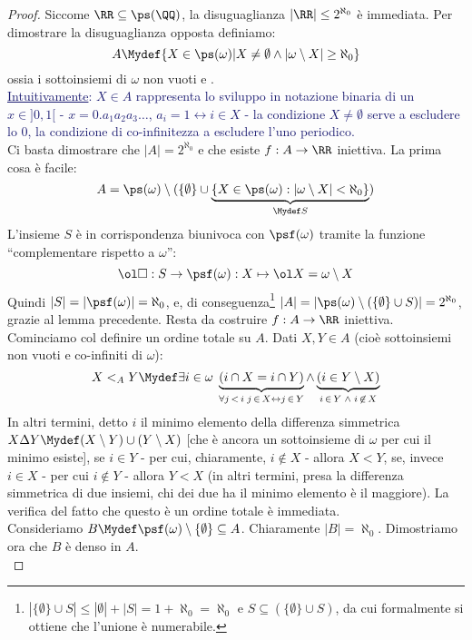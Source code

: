\documentclass[11pt]{scrartcl}
\begin{document}
\begin{proof}
	Siccome $\RR \subseteq \ps(\QQ)$, la disuguaglianza $|\RR| \leq 2^{\aleph_0}$ è immediata. Per dimostrare la disuguaglianza opposta definiamo:
	\[ A \Mydef \{X \in \ps(\omega) | X \ne \emptyset \land |\omega \setminus X| \geq \aleph_0\}
		\]
	ossia i sottoinsiemi di $\omega$ non vuoti e .\\
	\textcolor{MidnightBlue}{\underline{Intuitivamente}: $X \in A$ rappresenta lo sviluppo in notazione binaria di un $x \in ]0,1[$ - $x = 0.a_1a_2a_3 \ldots$, $a_i = 1 \leftrightarrow i \in X$ - la condizione $X \ne \emptyset$ serve a escludere lo 0, la 
	condizione di co-infinitezza a escludere l'uno periodico.}\\
	Ci basta dimostrare che $|A| = 2^{\aleph_0}$ e che esiste $f : A \rightarrow \RR$ iniettiva. La prima cosa è facile:
	\[ A = \ps(\omega)\setminus (\{\emptyset\} \cup \underbrace{\{X \in \ps(\omega) : |\omega \setminus X|<\aleph_0\}}_{\Mydef S})
		\]
	L'insieme $S$ è in corrispondenza biunivoca con $\psf(\omega)$ tramite la funzione ``complementare rispetto a $\omega$'':
	\[ \ol \square : S \rightarrow \psf(\omega) : X \mapsto \ol X = \omega \setminus X
		\]
	Quindi $|S| = |\psf(\omega)| = \aleph_0$, e, di conseguenza\footnote{$|\{\emptyset\} \cup S| \leq |\emptyset| + |S| = 1 + \aleph_0 = \aleph_0$ e $S \subseteq (\{\emptyset\} \cup S)$, da cui formalmente
	si ottiene che l'unione è numerabile.} $|A| = |\ps(\omega)\setminus(\{\emptyset\}\cup S)| = 2^{\aleph_0}$, grazie al lemma precedente.
	Resta da costruire $f : A \rightarrow \RR$ iniettiva.\\
	Cominciamo col definire un ordine totale su $A$. Dati $X,Y \in A$ (cioè sottoinsiemi non vuoti e co-infiniti di $\omega$):
	\[ X <_A Y \Mydef \exists i \in \omega \; \underbrace{(i \cap X = i \cap Y)}_{\forall j \,<\, i \; j \,\in\, X \leftrightarrow j \,\in\, Y} \land \underbrace{(i \in Y \setminus X)}_{i \,\in\, Y\; \land\; i \,\not\in \,X}
		\]
	In altri termini, detto $i$ il minimo elemento della differenza simmetrica $X \Delta Y \Mydef (X \setminus Y) \cup (Y \setminus X)$ [che è ancora un sottoinsieme di $\omega$ per cui il minimo esiste], se $i \in Y$ - per cui, chiaramente, $i \not \in X$ - allora $X < Y$, se, invece $i \in X$ -
	per cui $i \not \in Y$ - allora $Y < X$ (in altri termini, presa la differenza simmetrica di due insiemi, chi dei due ha il minimo elemento è il maggiore). La verifica del fatto che questo è un ordine totale è immediata.\\
	Consideriamo $B \Mydef \psf(\omega) \setminus \{\emptyset\} \subseteq A$. Chiaramente $|B| = \aleph_0$. Dimostriamo ora che $B$ è denso in $A$.\\

\end{proof}
\end{document}
